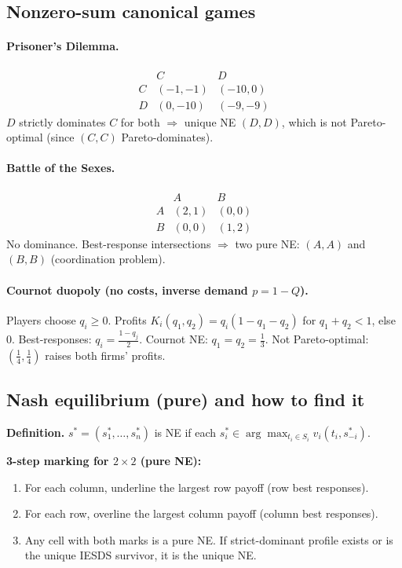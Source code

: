 \documentclass[10pt]{article}
\begin{document}
\subsection*{Nonzero-sum canonical games}
\paragraph{Prisoner’s Dilemma.}
\[
\begin{array}{c|cc}
 & C & D\\\hline
C &(-1,-1)&(-10,0)\\
D &(0,-10)&(-9,-9)
\end{array}
\]
$D$ strictly dominates $C$ for both $\Rightarrow$ unique NE $(D,D)$, which is not Pareto-optimal (since $(C,C)$ Pareto-dominates).

\paragraph{Battle of the Sexes.}
\[
\begin{array}{c|cc}
 & A & B\\\hline
A&(2,1)&(0,0)\\
B&(0,0)&(1,2)
\end{array}
\]
No dominance. Best-response intersections $\Rightarrow$ two pure NE: $(A,A)$ and $(B,B)$ (coordination problem).

\paragraph{Cournot duopoly (no costs, inverse demand $p=1-Q$).}
Players choose $q_i\ge 0$. Profits $K_i(q_1,q_2)=q_i(1-q_1-q_2)$ for $q_1+q_2<1$, else $0$.
Best-responses: $q_i=\frac{1-q_j}{2}$. Cournot NE: $q_1=q_2=\tfrac{1}{3}$.
Not Pareto-optimal: $(\tfrac14,\tfrac14)$ raises both firms’ profits.

\subsection*{Nash equilibrium (pure) and how to find it}
\textbf{Definition.} $s^*=(s_1^*,\dots,s_n^*)$ is NE if each $s_i^*\in\arg\max_{t_i\in S_i}v_i(t_i,s_{-i}^*)$.

\textbf{3-step marking for $2\times 2$ (pure NE):}
\begin{enumerate}[label=\arabic*)]
  \item For each column, underline the largest row payoff (row best responses).
  \item For each row, overline the largest column payoff (column best responses).
  \item Any cell with both marks is a pure NE. If strict-dominant profile exists or is the unique IESDS survivor, it is the unique NE.
\end{enumerate}
\end{document}
